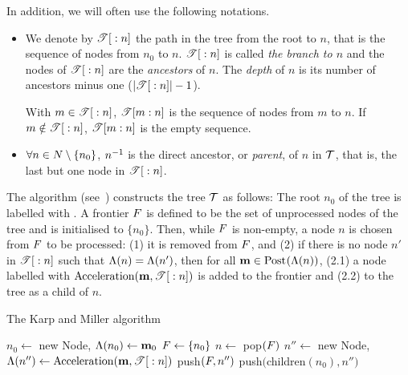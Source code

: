 In addition, we will often use the following notations.
\begin{itemize}
  \item We denote by $\treepath{n}$ the path in the tree from the root to $n$, that is the sequence of nodes from $n_0$ to $n$.
    $\treepath{n}$ is called \emph{the branch to $n$} and the nodes of $\treepath{n}$ are the \emph{ancestors} of $n$.
		The \emph{depth} of $n$ is its number of ancestors minus one ($|\treepath{n}| - 1$).

    With $m \in \treepath{n}$, $\treepath[m]{n}$ is the sequence of nodes from $m$ to $n$.
    If $m \notin \treepath{n}$, $\treepath[m]{n}$ is the empty sequence.
  \item $\forall n \in \nodes \setminus \{n_0\}$, $\parent{n}$ is the direct ancestor, or \emph{parent}, of $n$ in $\nameT$, that is, the last but one node in $\treepath{n}$.
\end{itemize}

The algorithm (see~) constructs the tree $\nameT$ as follows:
The root $n_0$ of the tree is labelled with \mari.
A frontier $\front$ is defined to be the set of unprocessed nodes of the tree and is initialised to $\{n_0\}$.
Then, while $\front$ is non-empty, a node $n$ is chosen from $\front$ to be processed:
(1) it is removed from $\front$, and (2) if there is no node $n'$ in $\treepath{n}$ such that $\lab{n} = \lab{n'}$, then for all \omark $\mar \in \post{\lab{n}}$, (2.1) a node labelled with $\kmacc{\mar, \treepath{n}}$ is added to the frontier and (2.2) to the tree as a child of $n$.

\begin{algorithm}
  \caption{The Karp and Miller algorithm}
  \label{algo:km}

  \begin{algorithmic}
    \State $n_0 \gets $ new Node, $\lab{n_0} \gets \mar_0$
    \State $\front \gets \{n_0\}$
    \While{$\front \neq \emptyset$}
      \State $n \gets$ pop$(\front)$ 
       
          \State $n'' \gets $ new Node, $\lab{n''} \gets \kmacc{\mar, \treepath{n}}$
          \State push$(\front, n'')$ 
          \State push$($children$(n_0), n'')$ 
        \EndFor
      \EndIf
    \EndWhile
  \end{algorithmic}
\end{algorithm}


